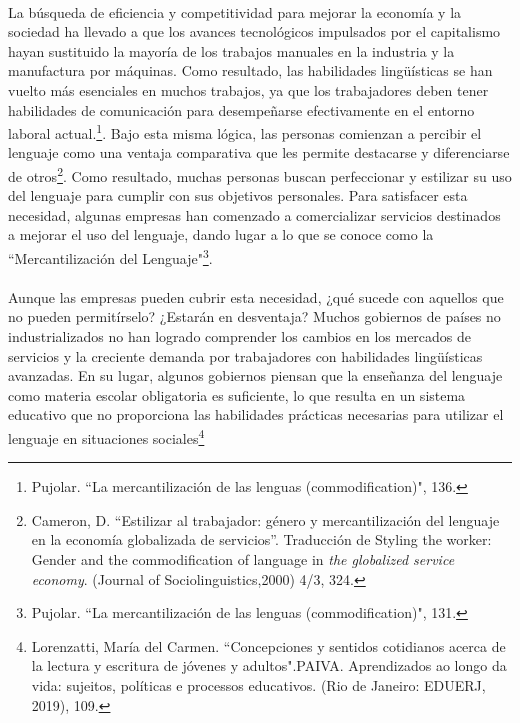 \documentclass{article}
\begin{document}
    \paragraph{}
    La búsqueda de eficiencia y competitividad para mejorar la economía y la sociedad ha llevado a que los avances tecnológicos impulsados por el capitalismo hayan sustituido la mayoría de los trabajos manuales en la industria y la manufactura por máquinas. Como resultado, las habilidades lingüísticas se han vuelto más esenciales en muchos trabajos, ya que los trabajadores deben tener habilidades de comunicación para desempeñarse efectivamente en el entorno laboral actual.\footnote{Pujolar. ``La mercantilización de las lenguas (commodification)", 136.}. Bajo esta misma lógica, las personas comienzan a percibir el lenguaje como una ventaja comparativa que les permite destacarse y diferenciarse de otros\footnote{Cameron, D. ``Estilizar al trabajador: género y mercantilización del lenguaje en la economía globalizada de servicios”. Traducción de Styling the worker: Gender and the commodification of language in \emph{the globalized service economy}. (Journal of Sociolinguistics,2000) 4/3, 324.}. Como resultado, muchas personas buscan perfeccionar y estilizar su uso del lenguaje para cumplir con sus objetivos personales. Para satisfacer esta necesidad, algunas empresas han comenzado a comercializar servicios destinados a mejorar el uso del lenguaje, dando lugar a lo que se conoce como la ``Mercantilización del Lenguaje"\footnote{Pujolar. ``La mercantilización de las lenguas (commodification)", 131.}. 

    \paragraph{}
    Aunque las empresas pueden cubrir esta necesidad, ¿qué sucede con aquellos que no pueden permitírselo? ¿Estarán en desventaja? Muchos gobiernos de países no industrializados no han logrado comprender los cambios en los mercados de servicios y la creciente demanda por trabajadores con habilidades lingüísticas avanzadas. En su lugar, algunos gobiernos piensan que la enseñanza del lenguaje como materia escolar obligatoria es suficiente, lo que resulta en un sistema educativo que no proporciona las habilidades prácticas necesarias para utilizar el lenguaje en situaciones sociales\footnote{Lorenzatti, María del Carmen. ``Concepciones y sentidos cotidianos acerca de la lectura y escritura de jóvenes y adultos".PAIVA. Aprendizados ao longo da vida: sujeitos, políticas e processos educativos. (Rio de Janeiro: EDUERJ, 2019), 109.}
\end{document}
